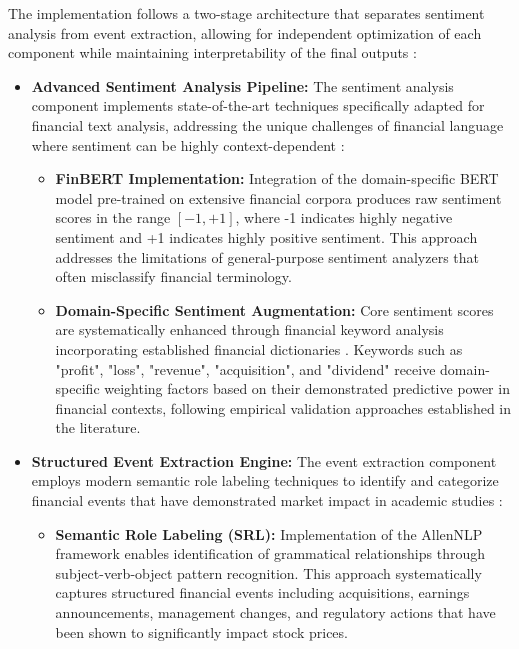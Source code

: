 \documentclass[3p,times,procedia]{elsarticle}
\begin{document}
The implementation follows a two-stage architecture that separates sentiment analysis from event extraction, allowing for independent optimization of each component while maintaining interpretability of the final outputs \cite{Ribeiro2016}:

\begin{itemize}
\item \textbf{Advanced Sentiment Analysis Pipeline:} The sentiment analysis component implements state-of-the-art techniques specifically adapted for financial text analysis, addressing the unique challenges of financial language where sentiment can be highly context-dependent \cite{Loughran2011}:

\begin{itemize}
\item \textbf{FinBERT Implementation:} Integration of the domain-specific BERT model pre-trained on extensive financial corpora \cite{Araci2019,Devlin2019} produces raw sentiment scores in the range $[-1, +1]$, where -1 indicates highly negative sentiment and +1 indicates highly positive sentiment. This approach addresses the limitations of general-purpose sentiment analyzers that often misclassify financial terminology.

\item \textbf{Domain-Specific Sentiment Augmentation:} Core sentiment scores are systematically enhanced through financial keyword analysis incorporating established financial dictionaries \cite{Loughran2011}. Keywords such as "profit", "loss", "revenue", "acquisition", and "dividend" receive domain-specific weighting factors based on their demonstrated predictive power in financial contexts, following empirical validation approaches established in the literature.
\end{itemize}

\item \textbf{Structured Event Extraction Engine:} The event extraction component employs modern semantic role labeling techniques to identify and categorize financial events that have demonstrated market impact in academic studies \cite{Ding2015,Daniel1998}:

\begin{itemize}
\item \textbf{Semantic Role Labeling (SRL):} Implementation of the AllenNLP framework \cite{Gardner2018,Shi2017} enables identification of grammatical relationships through subject-verb-object pattern recognition. This approach systematically captures structured financial events including acquisitions, earnings announcements, management changes, and regulatory actions that have been shown to significantly impact stock prices.


\end{itemize}
\end{itemize}
\end{document}
